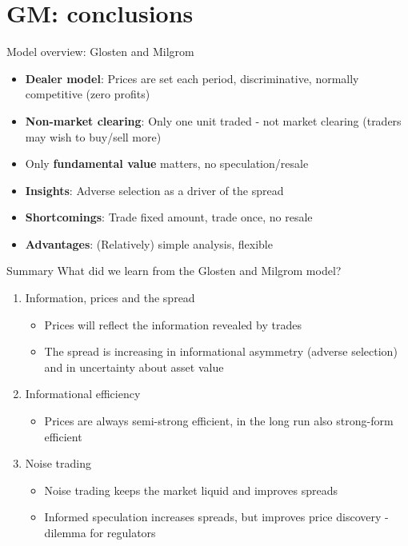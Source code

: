 \documentclass[english,10pt
,aspectratio=169
]{beamer}
\begin{document}
\section{GM: conclusions}

\begin{frame}[label=overview]{Model overview: Glosten and Milgrom}
	\begin{itemize}
		\item \textbf{Dealer model}: Prices are set each period, discriminative, normally competitive (zero profits)
		\item \textbf{Non-market clearing}: Only one unit traded  - not market clearing (traders may wish to buy/sell more)
		\item Only \textbf{fundamental value} matters,  no speculation/resale
	\end{itemize}
	\begin{itemize}
		\item \textbf{Insights}: Adverse selection as a driver of the spread
		\item \textbf{Shortcomings}: Trade fixed amount, trade once, no resale
		\item \textbf{Advantages}: (Relatively) simple analysis, flexible %
	\end{itemize}
\end{frame}


\begin{frame}{Summary}
	What did we learn from the Glosten and Milgrom model?
	\begin{enumerate}
		\item Information, prices and the spread
		\begin{itemize}
			\item Prices will reflect the information revealed by trades
			\item The spread is increasing in informational asymmetry (adverse selection) and in uncertainty about asset value
		\end{itemize}
		\item Informational efficiency
		\begin{itemize}
			\item Prices are always semi-strong efficient, in the long run also strong-form efficient
		\end{itemize}
		\item Noise trading
		\begin{itemize}
			\item Noise trading keeps the market liquid and improves spreads
			\item Informed speculation increases spreads, but improves price discovery - dilemma for regulators
		\end{itemize}
	\end{enumerate}
\end{frame}
\end{document}
